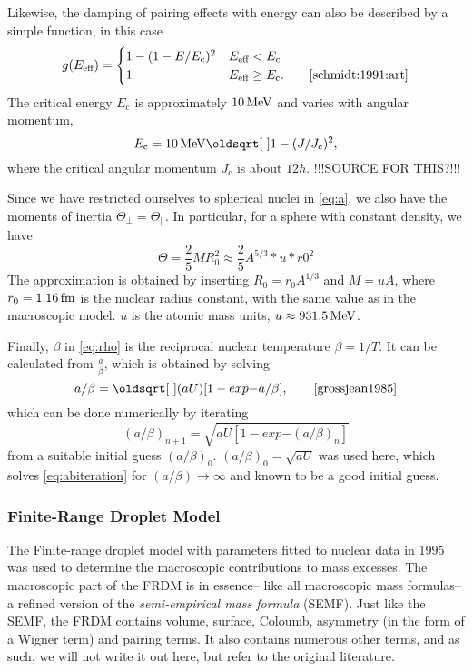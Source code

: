 Likewise, the damping of pairing effects with energy can also be described by a simple function, in this case
\begin{equation}
g(E_\text{eff}) = \begin{cases} 1-(1-E/E_\text{c})^2 & E_\text{eff} < E_\text{c} \\
 1 & E_\text{eff} \ge E_\text{c}.\qquad\cite{schmidt:1991:art}
\end{cases}
\end{equation}
The critical energy $E_\text{c}$ is approximately $\unit[10]{MeV}$ and varies with angular momentum, 
\begin{equation}
E_\text{c} = \unit[10]{MeV}\sqrt{1-(J/J_\text{c})^2},
\end{equation}
where the critical angular momentum $J_\text{c}$ is about $12\hbar$. !!!SOURCE FOR THIS?!!!

Since we have restricted ourselves to spherical nuclei in \eqref{eq:a}, we also have the moments of inertia $\Theta_\perp = \Theta_\parallel$. In particular, for a sphere with constant density, we have
\begin{equation}
\Theta = \frac{2}{5} M R_0^2 \approx \frac{2}{5} A^{5/3}*u*r0^2
\end{equation}
The approximation is obtained by inserting $R_0 = r_0 A^{1/3}$ and $M=u A$, where $r_0=\unit[1.16]{fm}$ is the nuclear radius constant, with the same value as in the macroscopic model\cite{moller1995}. $u$ is the atomic mass units, $u \approx \unit[931.5]{MeV}$.

Finally, $\beta$ in \eqref{eq:rho} is the reciprocal nuclear temperature $\beta=1/T$. It can be calculated from $\tfrac{a}{\beta}$, which is obtained by solving
\begin{equation}
a/\beta=\sqrt{(aU)[1 -exp{-a/\beta}]},\qquad\cite{grossjean1985}\label{eq:abiteration}
\end{equation}
which can be done numerically by iterating
\begin{equation}
(a/\beta)_{n+1}=\sqrt{aU[1 -exp{-(a/\beta)_n}]}
\end{equation}
from a suitable initial guess $(a/\beta)_{0}$. $(a/\beta)_{0}=\sqrt{aU}$ was used here, which solves \eqref{eq:abiteration} for $(a/\beta) \to \infty$ and known to be a good initial guess\cite{grossjean1985}.

\subsubsection{Finite-Range Droplet Model}
\label{sec:frdm1995}
The Finite-range droplet model with parameters fitted to nuclear data in 1995\cite{moller1995} was used to determine the macroscopic contributions to mass excesses. The macroscopic part of the FRDM is in essence-- like all macroscopic mass formulas-- a refined version of the \emph{semi-empirical mass formula} (SEMF). Just like the SEMF, the FRDM contains volume, surface, Coloumb, asymmetry (in the form of a Wigner term) and pairing terms. It also contains numerous other terms, and as such, we will not write it out here, but refer to the original literature\cite{moller1995}.

